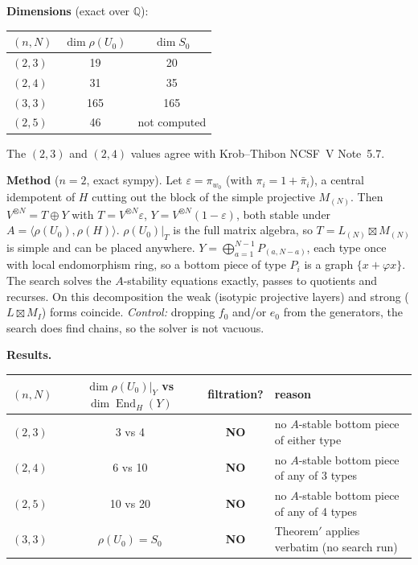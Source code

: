 \documentclass[11pt]{amsart}
\newcommand{\pib}{\bar\pi}
\newcommand{\End}{\operatorname{End}}
\theoremstyle{plain}
\theoremstyle{definition}
\begin{document}
\smallskip
\noindent\textbf{Dimensions} (exact over $\mathbb{Q}$):
\begin{center}
\begin{tabular}{lcc}
\toprule
$(n,N)$ & $\dim\rho(U_0)$ & $\dim S_0$\\
\midrule
$(2,3)$ & 19 & 20\\
$(2,4)$ & 31 & 35\\
$(3,3)$ & 165 & 165\\
$(2,5)$ & 46 & not computed\\
\bottomrule
\end{tabular}
\end{center}
The $(2,3)$ and $(2,4)$ values agree with Krob--Thibon NCSF~V Note~5.7.

\smallskip
\noindent\textbf{Method} ($n=2$, exact sympy). Let $\varepsilon=\pi_{w_0}$ (with $\pi_i=1+\pib_i$), a central idempotent of $H$ cutting out the block of the simple projective $M_{(N)}$. Then $V^{\otimes N}=T\oplus Y$ with $T=V^{\otimes N}\varepsilon$, $Y=V^{\otimes N}(1-\varepsilon)$, both stable under $A=\langle\rho(U_0),\rho(H)\rangle$. $\rho(U_0)|_T$ is the full matrix algebra, so $T=L_{(N)}\boxtimes M_{(N)}$ is simple and can be placed anywhere. $Y=\bigoplus_{a=1}^{N-1}P_{(a,N-a)}$, each type once with local endomorphism ring, so a bottom piece of type $P_i$ is a graph $\{x+\varphi x\}$. The search solves the $A$-stability equations exactly, passes to quotients and recurses. On this decomposition the weak (isotypic projective layers) and strong ($L\boxtimes M_I$) forms coincide. \emph{Control:} dropping $f_0$ and/or $e_0$ from the generators, the search does find chains, so the solver is not vacuous.

\smallskip
\noindent\textbf{Results.}
\begin{center}
\begin{tabular}{lccl}
\toprule
$(n,N)$ & $\dim\rho(U_0)|_Y$ vs $\dim\End_H(Y)$ & filtration? & reason\\
\midrule
$(2,3)$ & 3 vs 4 & \textbf{NO} & no $A$-stable bottom piece of either type\\
$(2,4)$ & 6 vs 10 & \textbf{NO} & no $A$-stable bottom piece of any of 3 types\\
$(2,5)$ & 10 vs 20 & \textbf{NO} & no $A$-stable bottom piece of any of 4 types\\
$(3,3)$ & $\rho(U_0)=S_0$ & \textbf{NO} & Theorem$'$ applies verbatim (no search run)\\
\bottomrule
\end{tabular}
\end{center}
\end{document}
